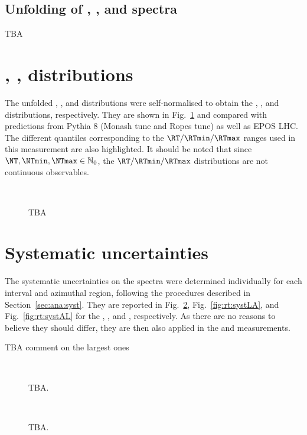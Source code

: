 \subsection{Unfolding of \KOs, \LA, and \AL \pt spectra}

TBA

\section{\RT, \RTmin, \RTmax distributions}

The unfolded \NT, \NTmin, and \NTmax distributions were self-normalised to obtain the \RT, \RTmin, and \RTmax distributions, respectively. They are shown in Fig.~\ref{fig:rt:rtdistr} and compared with predictions from Pythia 8 (Monash tune and Ropes tune) as well as EPOS LHC. The different quantiles corresponding to the $\RT/\RTmin/\RTmax$ ranges used in this measurement are also highlighted. It should be noted that since $\NT, \NTmin, \NTmax \in \mathbb{N}_0$, the $\RT/\RTmin/\RTmax$ distributions are not continuous observables.

\begin{figure}%
\\
\caption{TBA}
\label{fig:rt:rtdistr}
\end{figure}

\section{Systematic uncertainties}

The systematic uncertainties on the \pt spectra were determined individually for each \RT interval and azimuthal region, following the procedures described in Section~\ref{sec:ana:syst}. They are reported in Fig.~\ref{fig:rt:systK0s}, Fig.~\ref{fig:rt:systLA}, and Fig.~\ref{fig:rt:systAL} for the \KOs, \LA, and \AL, respectively. As there are no reasons to believe they should differ, they are then also applied in the \RTmin and \RTmax measurements.

TBA comment on the largest ones

\begin{figure}%
\\
\caption{TBA.}
\label{fig:rt:systK0s}
\end{figure}

\begin{figure}%
\\
\caption{TBA.}
\label{fig:rt:systL}
\end{figure}

